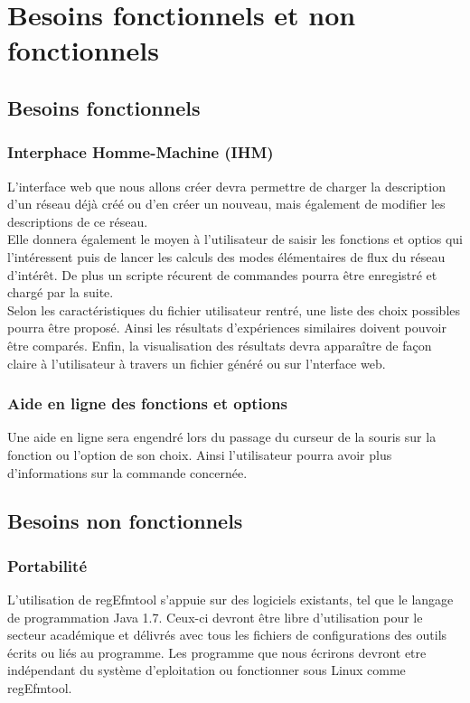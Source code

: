 \chapter{Besoins fonctionnels et non fonctionnels}

\section{Besoins fonctionnels}

\subsection{Interphace Homme-Machine (IHM)}
L'interface web que nous allons créer devra permettre de charger la description d'un réseau déjà créé ou d'en créer un nouveau, mais également de modifier les descriptions de ce réseau.\\
Elle donnera également le moyen à l'utilisateur de saisir les fonctions et optios qui l'intéressent puis de lancer les calculs des modes élémentaires de flux du réseau d'intérêt. De plus un scripte récurent de commandes pourra être enregistré et chargé par la suite.\\
Selon les caractéristiques du fichier utilisateur rentré, une liste des choix possibles pourra être proposé. Ainsi les résultats d'expériences similaires doivent pouvoir être comparés.
Enfin, la visualisation des résultats devra apparaître de façon claire à l'utilisateur à travers un fichier généré ou sur l'nterface web.

\subsection{Aide en ligne des fonctions et options}
Une aide en ligne sera engendré lors du passage du curseur de la souris sur la fonction ou l'option de son choix. Ainsi l'utilisateur pourra avoir plus d'informations sur la commande concernée.



\section{Besoins non fonctionnels}

\subsection{Portabilité}
L'utilisation de regEfmtool s'appuie sur des logiciels existants, tel que le langage de programmation Java 1.7. Ceux-ci devront être libre d'utilisation pour le secteur académique et délivrés avec tous les fichiers de configurations des outils écrits ou liés au programme. Les programme que nous écrirons devront etre indépendant du système d'eploitation ou fonctionner sous Linux comme regEfmtool.

